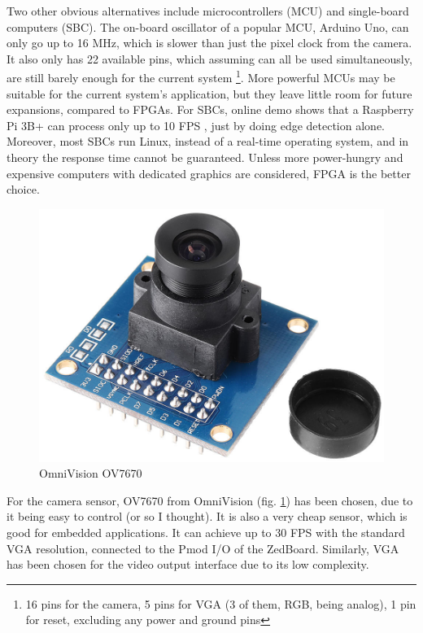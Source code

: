 \documentclass{IEEEtran}
\begin{document}
	Two other obvious alternatives include microcontrollers (MCU) and single-board computers (SBC). The on-board oscillator of a popular MCU, Arduino Uno, can only go up to 16 MHz, which is slower than just the pixel clock from the camera. It also only has 22 available pins, which assuming can all be used simultaneously, are still barely enough for the current system \footnote{16 pins for the camera, 5 pins for VGA (3 of them, RGB, being analog), 1 pin for reset, excluding any power and ground pins}. More powerful MCUs may be suitable for the current system’s application, but they leave little room for future expansions, compared to FPGAs. For SBCs, online demo shows that a Raspberry Pi 3B+ can process only up to 10 FPS \cite{rpi}, just by doing edge detection alone. Moreover, most SBCs run Linux, instead of a real-time operating system, and in theory the response time cannot be guaranteed. Unless more power-hungry and expensive computers with dedicated graphics are considered, FPGA is the better choice.
	\begin{figure}[h]
		\centering
		\includegraphics[scale=0.1]{ov7670}
		\caption{OmniVision OV7670}
		\label{fig:ov7670}
	\end{figure}
	For the camera sensor, OV7670 from OmniVision (fig. \ref{fig:ov7670}) \cite{ovdatasheet} has been chosen, due to it being easy to control (or so I thought). It is also a very cheap sensor, which is good for embedded applications. It can achieve up to 30 FPS with the standard VGA resolution, connected to the Pmod I/O of the ZedBoard. Similarly, VGA has been chosen for the video output interface due to its low complexity.
	
\end{document}
